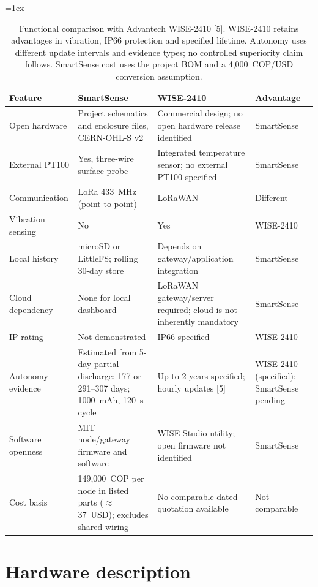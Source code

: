 \documentclass[11pt, letterpaper]{article}
\begin{document}
\begin{table}[h]
\centering
\tabulinesep=1ex
\begin{tabu} to \linewidth {|X|X[c]|X[c]|X[0.6,c]|}
\hline
\textbf{Feature} & \textbf{SmartSense} & \textbf{WISE-2410} & \textbf{Advantage} \\\hline
Open hardware & Project schematics and enclosure files, CERN-OHL-S v2 & Commercial design; no open hardware release identified & SmartSense \\\hline
External PT100 & Yes, three-wire surface probe & Integrated temperature sensor; no external PT100 specified & SmartSense \\\hline
Communication & LoRa 433~MHz (point-to-point) & LoRaWAN & Different \\\hline
Vibration sensing & No & Yes & WISE-2410 \\\hline
Local history & microSD or LittleFS; rolling 30-day store & Depends on gateway/application integration & SmartSense \\\hline
Cloud dependency & None for local dashboard & LoRaWAN gateway/server required; cloud is not inherently mandatory & SmartSense \\\hline
IP rating & Not demonstrated & IP66 specified & WISE-2410 \\\hline
Autonomy evidence & Estimated from 5-day partial discharge: 177 or 291--307 days; 1000~mAh, 120~s cycle & Up to 2 years specified; hourly updates [5] & WISE-2410 (specified); SmartSense pending \\\hline
Software openness & MIT node/gateway firmware and software & WISE Studio utility; open firmware not identified & SmartSense \\\hline
Cost basis & 149{,}000~COP per node in listed parts ($\approx$37~USD); excludes shared wiring & No comparable dated quotation available & Not comparable \\\hline
\end{tabu}
\caption{Functional comparison with Advantech WISE-2410 [5]. WISE-2410 retains advantages in vibration, IP66 protection and specified lifetime. Autonomy uses different update intervals and evidence types; no controlled superiority claim follows. SmartSense cost uses the project BOM and a 4{,}000~COP/USD conversion assumption.}
\label{tab:comparison}
\end{table}

\section{Hardware description}
\end{document}
